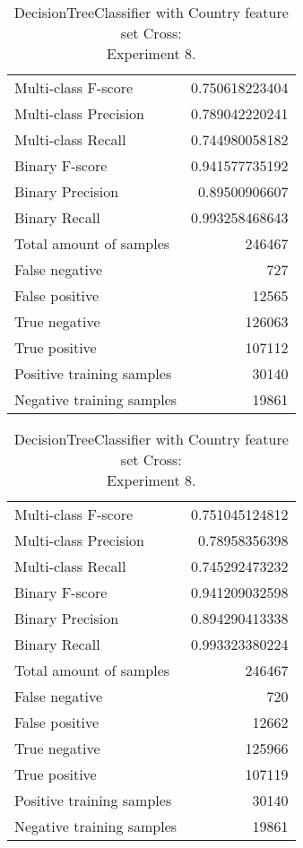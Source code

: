 \begin{table}[H]
\begin{minipage}{0.5\textwidth}
\caption{DecisionTreeClassifier with Country feature set Cross: \\Experiment 7.}
\centering
\begin{tabular}{l r}
\toprule
Multi-class F-score & 0.750618223404 \\
Multi-class Precision & 0.789042220241 \\
Multi-class Recall & 0.744980058182 \\
\midrule
Binary F-score & 0.941577735192 \\
Binary Precision & 0.89500906607 \\
Binary Recall & 0.993258468643 \\
\midrule
Total amount of samples & 246467 \\
False negative & 727 \\
False positive & 12565 \\
True negative & 126063 \\
True positive & 107112 \\
\midrule
Positive training samples & 30140 \\
Negative training samples & 19861 \\
\bottomrule
\end{tabular}

\end{minipage}
\hfillx
\begin{minipage}{0.5\textwidth}
\caption{DecisionTreeClassifier with Country feature set Cross: \\Experiment 8.}
\centering
\begin{tabular}{l r}
\toprule
Multi-class F-score & 0.751045124812 \\
Multi-class Precision & 0.78958356398 \\
Multi-class Recall & 0.745292473232 \\
\midrule
Binary F-score & 0.941209032598 \\
Binary Precision & 0.894290413338 \\
Binary Recall & 0.993323380224 \\
\midrule
Total amount of samples & 246467 \\
False negative & 720 \\
False positive & 12662 \\
True negative & 125966 \\
True positive & 107119 \\
\midrule
Positive training samples & 30140 \\
Negative training samples & 19861 \\
\bottomrule
\end{tabular}
\end{minipage}
\end{table}

